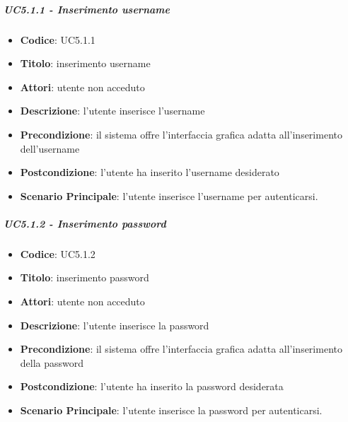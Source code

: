 		\subparagraph{UC5.1.1 - Inserimento username}
			\begin{itemize}
				\item \textbf{Codice}: UC5.1.1
				\item \textbf{Titolo}: inserimento username
				\item \textbf{Attori}: utente non acceduto
				\item \textbf{Descrizione}: l'utente inserisce l'username
				\item \textbf{Precondizione}: il sistema offre l'interfaccia grafica adatta all'inserimento dell'username
				\item \textbf{Postcondizione}: l'utente ha inserito l'username desiderato
				\item \textbf{Scenario Principale}: l'utente inserisce l'username per autenticarsi.
			\end{itemize}
		
		\subparagraph{UC5.1.2 - Inserimento password}
			\begin{itemize}
				\item \textbf{Codice}: UC5.1.2	
				\item \textbf{Titolo}: inserimento password
				\item \textbf{Attori}: utente non acceduto
				\item \textbf{Descrizione}: l'utente inserisce la password
				\item \textbf{Precondizione}: il sistema offre l'interfaccia grafica adatta all'inserimento della password
				\item \textbf{Postcondizione}: l'utente ha inserito la password desiderata
				\item \textbf{Scenario Principale}: l'utente inserisce la password per autenticarsi.
			\end{itemize}
		
		
	
